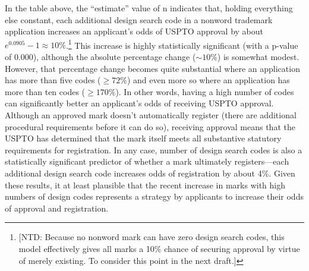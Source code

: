\documentclass[letterpaper, 11pt, oneside]{article}
\begin{document}
 \par

\noindent In the table above, the ``estimate'' value of n indicates that, holding everything else constant, each additional design search code in a nonword trademark application increases an applicant's odds of USPTO approval by about $e^{0.0905}-1 \approx 10\%$.\footnote{[NTD: Because no nonword mark can have zero design search codes, this model effectively gives all marks a 10\% chance of securing approval by virtue of merely existing. To consider this point in the next draft.]} This increase is highly statistically significant (with a p-value of 0.000), although the absolute percentage change ($\sim10\%$) is somewhat modest. However, that percentage change becomes quite substantial where an application has more than five codes ($\ge 72\%$) and even more so where an application has more than ten codes ($\ge 170\%$). In other words, having a high number of codes can significantly better an applicant's odds of receiving USPTO approval. Although an approved mark doesn't automatically register (there are additional procedural requirements before it can do so), receiving approval means that the USPTO has determined that the mark itself meets all substantive statutory requirements for registration. In any case, number of design search codes is also a statistically significant predictor of whether a mark ultimately registers—each additional design search code increases odds of registration by about 4\%. Given these results, it at least plausible that the recent increase in marks with high numbers of design codes represents a strategy by applicants to increase their odds of approval and registration. 
\end{document}
